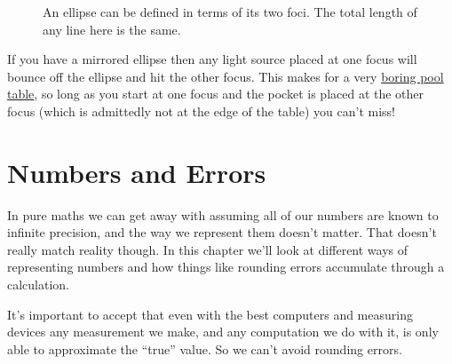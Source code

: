 \documentclass[fleqn]{LectureClass/LectureClass}
\begin{document}
    \begin{figure}
        \centering
        \caption[Ellipse from foci]{An ellipse can be defined in terms of its two foci. The total length of any line here is the same.}
        \label{fig:ellipse from foci}
    \end{figure}
    
    
    \begin{app}{}{}
        If you have a mirrored ellipse then any light source placed at one focus will bounce off the ellipse and hit the other focus.
        This makes for a very \href{https://www.youtube.com/watch?v=4KHCuXN2F3I}{boring pool table}, so long as you start at one focus and the pocket is placed at the other focus (which is admittedly not at the edge of the table) you can't miss!
    \end{app}
    
    \chapter{Numbers and Errors}
    In pure maths we can get away with assuming all of our numbers are known to infinite precision, and the way we represent them doesn't matter.
    That doesn't really match reality though.
    In this chapter we'll look at different ways of representing numbers and how things like rounding errors accumulate through a calculation.
    
    It's important to accept that even with the best computers and measuring devices any measurement we make, and any computation we do with it, is only able to approximate the \enquote{true} value.
    So we can't avoid rounding errors.
    
\end{document}

